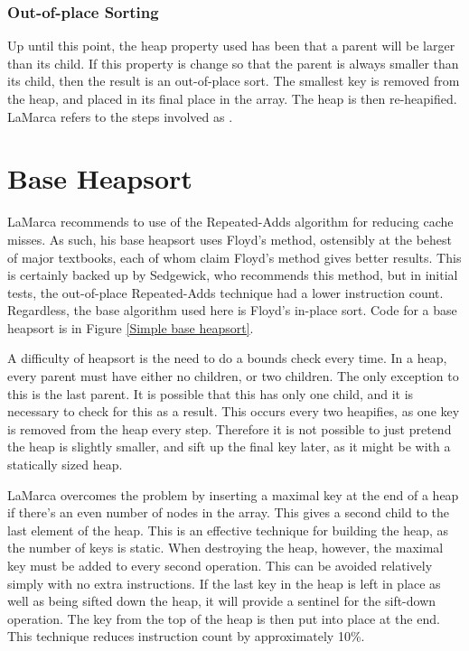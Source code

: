 \subsubsection{Out-of-place Sorting}
Up until this point, the heap property used has been that a parent will be
larger than its child. If this property is change so that the parent is always
smaller than its child, then the result is an out-of-place sort. The smallest
key is removed from the heap, and placed in its final place in the array. The
heap is then re-heapified. LaMarca refers to the steps involved as
.

\section{Base Heapsort}
LaMarca recommends to use of the Repeated-Adds algorithm for reducing
cache misses. As such, his base heapsort uses Floyd's method, ostensibly at
the behest of major textbooks, each of whom claim Floyd's method gives better
results. This is certainly backed up by Sedgewick, who recommends this method,
but in initial tests, the out-of-place Repeated-Adds technique had a lower
instruction count. Regardless, the base algorithm used here is Floyd's in-place
sort. Code for a base heapsort is in Figure \ref{Simple base heapsort}.


A difficulty of heapsort is the need to do a bounds check every time. In a heap,
every parent must have either no children, or two children. The only exception
to this is the last parent. It is possible that this has only one child, and it
is necessary to check for this as a result. This occurs every two heapifies, as
one key is removed from the heap every step. Therefore it is not possible to just
pretend the heap is slightly smaller, and sift up the final key later, as it
might be with a statically sized heap.

LaMarca overcomes the problem by inserting a maximal key at the end of a heap if
there's an even number of nodes in the array. This gives a second child to the
last element of the heap. This is an effective technique for building the heap,
as the number of keys is static. When destroying the heap, however, the
maximal key must be added to every second operation. This can be avoided
relatively simply with no extra instructions. If the last key in the heap is
left in place as well as being sifted down the heap, it will provide a
sentinel for the sift-down operation. The key from the top of the heap is then
put into place at the end. This technique reduces instruction count by
approximately 10\%.

